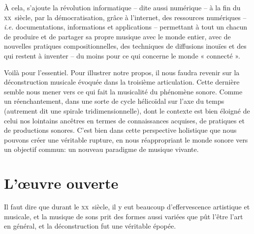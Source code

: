 \documentclass{article}
\begin{document}
À cela, s'ajoute la révolution informatique  -- dite aussi numérique --  à la fin du \textsc{xx}\ieme ~siècle,  par la démocratisation, grâce à l'internet, des ressources numériques -- \textit{i.e.} documentations, informations et applications -- permettant à tout un chacun de produire et de partager sa propre musique avec le monde entier, avec de nouvelles pratiques compositionnelles, des techniques de diffusions inouïes et des qui restent à inventer -- du moins pour ce qui concerne le monde « connecté ».

\bigskip

Voilà pour l'essentiel. Pour illustrer notre propos, il nous faudra revenir sur la déconstruction musicale évoquée dans la troisième articulation. Cette dernière semble nous mener vers ce qui fait la musicalité du phénomène sonore. Comme un réenchantement, dans une sorte de cycle hélicoïdal sur l'axe du temps (autrement dit une spirale tridimensionnelle), dont le contexte est bien éloigné de celui nos lointains ancêtres en termes de connaissances acquises, de pratiques et de productions sonores. C'est bien dans cette perspective holistique que nous pouvons créer une véritable rupture, en nous réappropriant le monde sonore vers un objectif commun: un nouveau paradigme de musique vivante.

\section*{L'œuvre ouverte}
\label{oo}

Il faut dire que durant le \textsc{xx}\ieme ~siècle, il y eut beaucoup d'effervescence artistique et musicale, et la musique de sons prit des formes aussi variées que pût l'être l'art en général, et la déconstruction fut une véritable épopée.
\end{document}
